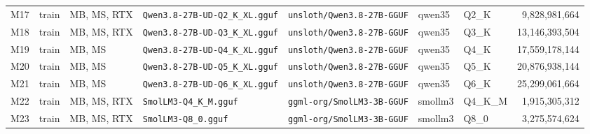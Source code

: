 \documentclass[10pt]{article}
\begin{document}
\begin{landscape}
\begin{longtable}{@{}l l L{0.75in} L{2.7in} L{2.45in} L{0.9in} l r@{}}
M17 & train & MB, MS, RTX & \nolinkurl{Qwen3.8-27B-UD-Q2_K_XL.gguf} & \nolinkurl{unsloth/Qwen3.8-27B-GGUF} & qwen35 & Q2\_K & 9,828,981,664 \\
M18 & train & MB, MS, RTX & \nolinkurl{Qwen3.8-27B-UD-Q3_K_XL.gguf} & \nolinkurl{unsloth/Qwen3.8-27B-GGUF} & qwen35 & Q3\_K & 13,146,393,504 \\
M19 & train & MB, MS & \nolinkurl{Qwen3.8-27B-UD-Q4_K_XL.gguf} & \nolinkurl{unsloth/Qwen3.8-27B-GGUF} & qwen35 & Q4\_K & 17,559,178,144 \\
M20 & train & MB, MS & \nolinkurl{Qwen3.8-27B-UD-Q5_K_XL.gguf} & \nolinkurl{unsloth/Qwen3.8-27B-GGUF} & qwen35 & Q5\_K & 20,876,938,144 \\
M21 & train & MB, MS & \nolinkurl{Qwen3.8-27B-UD-Q6_K_XL.gguf} & \nolinkurl{unsloth/Qwen3.8-27B-GGUF} & qwen35 & Q6\_K & 25,299,061,664 \\
M22 & train & MB, MS, RTX & \nolinkurl{SmolLM3-Q4_K_M.gguf} & \nolinkurl{ggml-org/SmolLM3-3B-GGUF} & smollm3 & Q4\_K\_M & 1,915,305,312 \\
M23 & train & MB, MS, RTX & \nolinkurl{SmolLM3-Q8_0.gguf} & \nolinkurl{ggml-org/SmolLM3-3B-GGUF} & smollm3 & Q8\_0 & 3,275,574,624 \\
\end{longtable}
\endgroup
\end{landscape}
\end{document}
